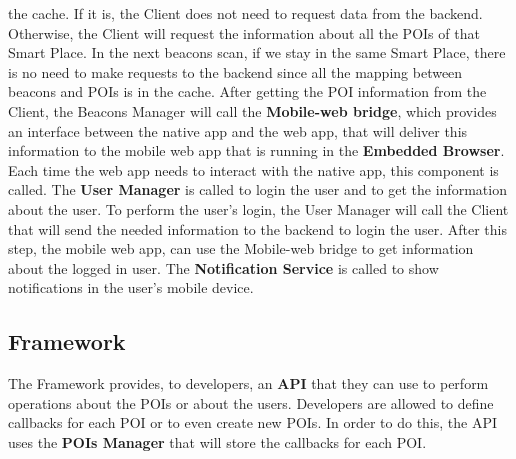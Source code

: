 the cache. If it is, the Client does not need to request
data from the backend. Otherwise, the Client will
request the information about all the POIs of that
Smart Place. In the next beacons scan, if we stay in
the same Smart Place, there is no need to make requests
to the backend since all the mapping between beacons
and POIs is in the cache.
After getting the POI information from the Client,
the Beacons Manager will call the \textbf{Mobile-web bridge},
which provides an interface between the native app
and the web app, that will deliver this information
to the mobile web app that is running in the
\textbf{Embedded Browser}. 
Each time the web app needs to interact
with the native app, this component is called.
The \textbf{User Manager} is called to login the
user and to get the information about the user. 
To perform the user's login, the User Manager
will call the Client that will send the needed information
to the backend to login the user. After this step,
the mobile web app, can use the Mobile-web bridge
to get information about the logged in user.
The \textbf{Notification Service} is called to
show notifications in the user's mobile device.

\subsection{Framework}
\label{sub:framework}
The Framework provides, to developers, an \textbf{API} that they
can use to perform operations about the POIs or about the users.
Developers are allowed to define callbacks for each POI or to
even create new POIs. In order to do this, the API
uses the \textbf{POIs Manager} that will store the callbacks
for each POI.

